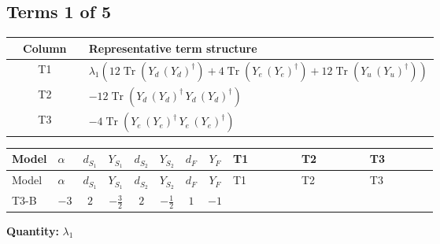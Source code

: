 \documentclass[8pt]{article}
\begin{document}
\begin{landscape}
\subsection*{Terms 1 of 5}
\begin{center}
\begin{tabular}{@{}c >{\raggedright\arraybackslash}p{0.82\linewidth}@{}}
\toprule
Column & Representative term structure \\
\midrule
T1 & \(\displaystyle {\lambda_1} (12 \operatorname{Tr}\!\left({Y_d}\,\left({Y_d}\right)^{\dagger}\right)+4 \operatorname{Tr}\!\left({Y_e}\,\left({Y_e}\right)^{\dagger}\right)+12 \operatorname{Tr}\!\left({Y_u}\,\left({Y_u}\right)^{\dagger}\right))\) \\
\midrule
T2 & \(\displaystyle -12 \operatorname{Tr}\!\left({Y_d}\,\left({Y_d}\right)^{\dagger}\,{Y_d}\,\left({Y_d}\right)^{\dagger}\right)\) \\
\midrule
T3 & \(\displaystyle -4 \operatorname{Tr}\!\left({Y_e}\,\left({Y_e}\right)^{\dagger}\,{Y_e}\,\left({Y_e}\right)^{\dagger}\right)\) \\
\midrule
\bottomrule
\end{tabular}
\end{center}
\smallskip
\tiny
\begin{longtable}{@{}llcccccc >{\raggedright\arraybackslash}p{0.21\linewidth} >{\raggedright\arraybackslash}p{0.21\linewidth} >{\raggedright\arraybackslash}p{0.21\linewidth}@{}}
\toprule
Model & $\alpha$ & $d_{S_1}$ & $Y_{S_1}$ & $d_{S_2}$ & $Y_{S_2}$ & $d_F$ & $Y_F$ & T1 & T2 & T3 \\
\midrule
\endfirsthead
\toprule
Model & $\alpha$ & $d_{S_1}$ & $Y_{S_1}$ & $d_{S_2}$ & $Y_{S_2}$ & $d_F$ & $Y_F$ & T1 & T2 & T3 \\
\midrule
\endhead
T3-B & $-3$ & $2$ & $-\frac{3}{2}$ & $2$ & $-\frac{1}{2}$ & $1$ & $-1$ & \scriptsize\adjustbox{max width=\linewidth}{$\begin{gathered} {\lambda_1} (12 \operatorname{Tr}\!\left({Y_d}\,\left({Y_d}\right)^{\dagger}\right)+4 \operatorname{Tr}\!\left({Y_e}\,\left({Y_e}\right)^{\dagger}\right)+12 \operatorname{Tr}\!\left({Y_u}\,\left({Y_u}\right)^{\dagger}\right))\end{gathered}$} & \scriptsize\adjustbox{max width=\linewidth}{$\begin{gathered} -12 \operatorname{Tr}\!\left({Y_d}\,\left({Y_d}\right)^{\dagger}\,{Y_d}\,\left({Y_d}\right)^{\dagger}\right)\end{gathered}$} & \scriptsize\adjustbox{max width=\linewidth}{$\begin{gathered} -4 \operatorname{Tr}\!\left({Y_e}\,\left({Y_e}\right)^{\dagger}\,{Y_e}\,\left({Y_e}\right)^{\dagger}\right)\end{gathered}$} \\
\midrule
\bottomrule
\end{longtable}
\clearpage
\noindent\textbf{Quantity: }$\lambda_1$\par\smallskip

\end{landscape}
\end{document}
